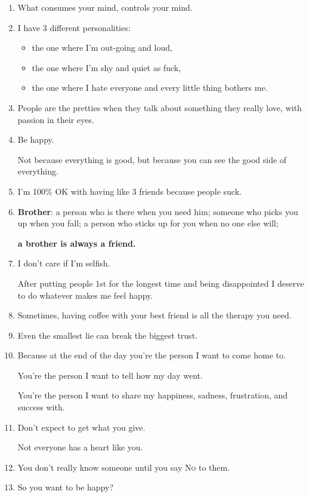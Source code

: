\documentclass{article}
\numberwithin{equation}{section}
\begin{document}
\begin{enumerate}
    Sometimes you just need to breathe, trust, let go, and see what happens.
    \item What consumes your mind, controls your mind.
    \item I have 3 different personalities:
    \begin{itemize}
        \item the one where I'm out-going and loud,
        \item the one where I'm shy and quiet as fuck,
        \item the one where I hate everyone and every little thing bothers me.
    \end{itemize}
    \item People are the pretties when they talk about something they really love, with passion in their eyes.
    \item Be happy.
    
    Not because everything is good, but because you can see the good side of everything.
    \item I'm 100\% OK with having like 3 friends because people suck.
    \item \textbf{Brother}: a person who is there when you need him; someone who picks you up when you fall; a person who sticks up for you when no one else will;
    
    \textbf{a brother is always a friend.}
    \item I don't care if I'm selfish.
    
    After putting people 1st for the longest time and being disappointed I deserve to do whatever makes me feel happy.
    \item Sometimes, having coffee with your best friend is all the therapy you need.
    \item Even the smallest lie can break the biggest trust.
    \item Because at the end of the day you're the person I want to come home to.
    
    You're the person I want to tell how my day went.
    
    You're the person I want to share my happiness, sadness, frustration, and success with.
    \item Don't expect to get what you give.
    
    Not everyone has a heart like you.
    \item You don't really know someone until you say \textsc{No} to them.
    \item So you want to be happy?
    

\end{enumerate}
\end{document}
